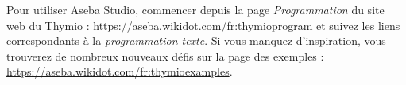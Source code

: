 Pour utiliser Aseba Studio, commencer depuis la page \emph{Programmation} du site web du Thymio : \url{https://aseba.wikidot.com/fr:thymioprogram} et suivez les liens correspondants à la \emph{programmation texte}.
Si vous manquez d'inspiration, vous trouverez de nombreux nouveaux défis sur la page des exemples : \url{https://aseba.wikidot.com/fr:thymioexamples}.

\vspace{4em}

